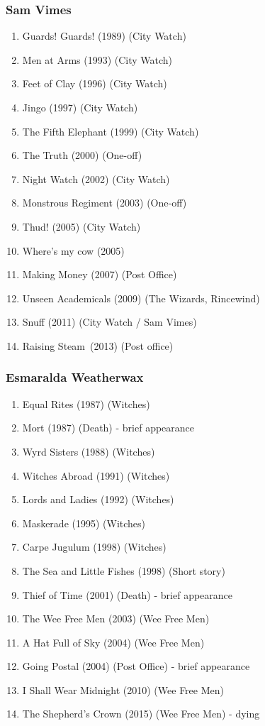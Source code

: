 \subsubsection{Sam Vimes}
\begin{enumerate}[topsep=0pt, partopsep=0pt,itemsep=2pt,parsep=2pt]
\item{Guards! Guards! (1989) (City Watch) }
\item{Men at Arms (1993) (City Watch) }
\item{Feet of Clay (1996) (City Watch) }
\item{Jingo (1997) (City Watch) }
\item{The Fifth Elephant (1999) (City Watch) }
\item{The Truth (2000) (One-off) }
\item{Night Watch (2002) (City Watch) }
\item{Monstrous Regiment (2003) (One-off) }
\item{Thud! (2005) (City Watch) }
\item{Where's my cow (2005) }
\item{Making Money (2007) (Post Office) }
\item{Unseen Academicals (2009) (The Wizards, Rincewind)}
\item{Snuff (2011) (City Watch / Sam Vimes)}
\item{Raising Steam (2013) (Post office)}
\end{enumerate}

\subsubsection{Esmaralda Weatherwax}
\begin{enumerate}[topsep=0pt, partopsep=0pt,itemsep=2pt,parsep=2pt]
 \item{Equal Rites (1987) (Witches) }
 \item{Mort (1987) (Death) - brief appearance }
 \item{Wyrd Sisters (1988) (Witches) }
 \item{Witches Abroad (1991) (Witches) }
 \item{Lords and Ladies (1992) (Witches) }
 \item{Maskerade (1995) (Witches) }
 \item{Carpe Jugulum (1998) (Witches) }
 \item{The Sea and Little Fishes (1998) (Short story) }
 \item{Thief of Time (2001) (Death) - brief appearance}
 \item{The Wee Free Men (2003) (Wee Free Men) }
 \item{A Hat Full of Sky (2004) (Wee Free Men) }
 \item{Going Postal (2004) (Post Office) - brief appearance}
 \item{I Shall Wear Midnight (2010) (Wee Free Men)}
 \item{The Shepherd's Crown (2015) (Wee Free Men) - dying}
\end{enumerate}
